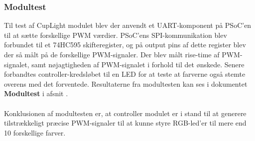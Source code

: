 \documentclass[Rapport/Rapport_main.tex]{subfiles}
\begin{document}
\subsubsection{Modultest}
Til test af CupLight modulet blev der anvendt et UART-komponent på PSoC'en til at sætte forskellige PWM værdier. PSoC'ens SPI-kommunikation blev forbundet til et 74HC595 skifteregister, og på output pins af dette register blev der så målt på de forskellige PWM-signaler. Der blev målt rise-time af PWM-signalet, samt nøjagtigheden af PWM-signalet i forhold til det ønskede. Senere forbandtes controller-kredsløbet til en LED for at teste at farverne også stemte overens med det forventede. Resultaterne fra modultesten kan ses i dokumentet \textbf{Modultest} i afsnit .\\\\
Konklusionen af modultesten er, at controller modulet er i stand til at generere tilstrækkeligt præcise PWM-signaler til at kunne styre RGB-led'er til mere end 10 forskellige farver. 
\end{document}
